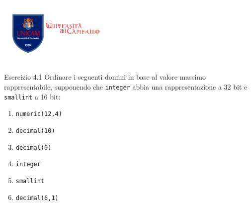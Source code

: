 \begin{frame}
\centering
\includegraphics[width=5.5cm]{img/unicam-logo.jpg}
\date{7 Maggio 2024}
\titlepage
\end{frame}


\begin{frame}{Esercizio 4.1}
         Ordinare i seguenti domini in base al valore massimo rappresentabile, supponendo che \texttt{integer} abbia una rappresentazione a 32 bit e \texttt{smallint} a 16 bit:
        \begin{enumerate}
            \item \texttt{numeric(12,4)}
            \item \texttt{decimal(10)}
            \item \texttt{decimal(9)}
            \item \texttt{integer}
            \item \texttt{smallint}
            \item \texttt{decimal(6,1)}
        \end{enumerate}
\end{frame}

